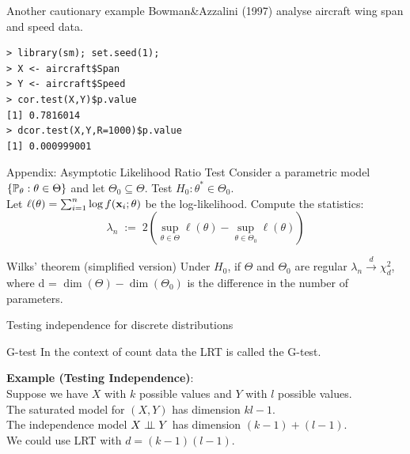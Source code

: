 \documentclass[11pt,handout,aspectratio=169,dvipsnames]{beamer}
\begin{document}
\begin{frame}[fragile]{Another cautionary example}
	Bowman\&Azzalini (1997) analyse aircraft wing span and speed data.	 \\[4mm]
	 \begin{lstlisting}
> library(sm); set.seed(1); 
> X <- aircraft$Span
> Y <- aircraft$Speed
> cor.test(X,Y)$p.value
[1] 0.7816014
> dcor.test(X,Y,R=1000)$p.value
[1] 0.000999001
\end{lstlisting}
\end{frame}

\begin{frame}{Appendix: Asymptotic Likelihood Ratio Test}
Consider a parametric model $\{\P_\theta: \theta\in \Theta\}$ and let $\Theta_0\subseteq \Theta$. Test \alert{$H_0:\theta^*\in\Theta_0$}.\\[4mm]
Let $\ell(\theta)=\sum_{i=1}^n\log f(\x_i;\theta)$ be the log-likelihood. Compute the statistics: 
$$
\lambda_n\;:=\;2(\sup_{\theta\in \Theta}\ell(\theta)-\sup_{\theta\in \Theta_0}\ell(\theta))
$$  
\begin{alertblock}{Wilks' theorem (simplified version)}
	Under $H_0$, if $\Theta$ and $\Theta_0$ are regular $\lambda_n\xrightarrow{d}\chi^2_d$, where d = $\dim(\Theta) - \dim(\Theta_0)$ is the difference in the number of parameters.
\end{alertblock}

\end{frame}

\begin{frame}{Testing independence for discrete distributions}
	\begin{block}{G-test}
In the context of count data the LRT is called the \alert{G-test}.\end{block}
\bigskip

\textbf{Example (Testing Independence)}:\\[4mm]
Suppose we have $X$ with $k$ possible values and $Y$ with $l$ possible values. \\[4mm]
	The saturated model for $(X,Y)$ has dimension $kl-1$.\\[4mm]
	The independence model $X\indep Y$ has dimension $(k-1)+(l-1)$.\\[4mm]
	We could use LRT with $d=(k-1)(l-1)$.


\end{frame}
\end{document}
